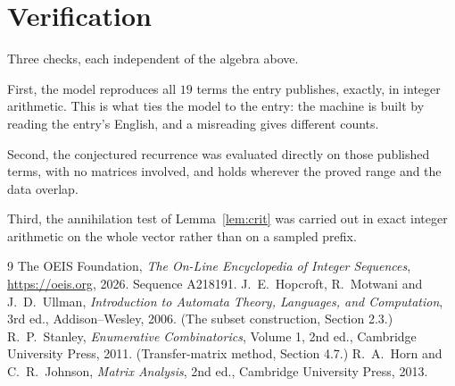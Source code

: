 \documentclass[11pt,a4paper]{article}
\theoremstyle{plain}
\theoremstyle{definition}
\begin{document}
\section{Verification}

Three checks, each independent of the algebra above.

First, the model reproduces all $19$ terms the entry publishes, exactly, in integer
arithmetic. This is what ties the model to the entry: the machine is built by reading the
entry's English, and a misreading gives different counts.

Second, the conjectured recurrence was evaluated directly on those published terms, with no
matrices involved, and holds wherever the proved range and the data overlap.

Third, the annihilation test of Lemma~\ref{lem:crit} was carried out in exact integer
arithmetic on the whole vector rather than on a sampled prefix.

\begin{thebibliography}{9}
 The OEIS Foundation, \emph{The On-Line Encyclopedia of Integer
Sequences}, \url{https://oeis.org}, 2026. Sequence A218191.
 J.~E.~Hopcroft, R.~Motwani and J.~D.~Ullman, \emph{Introduction to Automata
Theory, Languages, and Computation}, 3rd ed., Addison--Wesley, 2006. (The subset
construction, Section 2.3.)
 R.~P.~Stanley, \emph{Enumerative Combinatorics}, Volume 1, 2nd ed.,
Cambridge University Press, 2011. (Transfer-matrix method, Section 4.7.)
 R.~A.~Horn and C.~R.~Johnson, \emph{Matrix Analysis}, 2nd ed., Cambridge
University Press, 2013.
\end{thebibliography}
\end{document}
